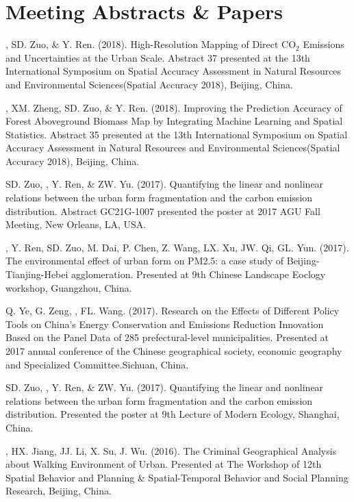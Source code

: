 \section*{Meeting Abstracts \& Papers}
\begin{etaremune}
\item
    \Shaoqing, SD. Zuo, \& Y. Ren. (2018).
    High-Resolution Mapping of Direct CO$_2$ Emissions and Uncertainties at the Urban Scale.
    Abstract 37 presented at the 13th International Symposium on Spatial Accuracy Assessment in Natural Resources and Environmental Sciences(Spatial Accuracy 2018), Beijing, China.
\item
    \Shaoqing\CF, XM. Zheng, SD. Zuo, \& Y. Ren. (2018).
    Improving the Prediction Accuracy of Forest Aboveground Biomass Map by Integrating Machine Learning and Spatial Statistics.
    Abstract 35 presented at the 13th International Symposium on Spatial Accuracy Assessment in Natural Resources and Environmental Sciences(Spatial Accuracy 2018), Beijing, China.
\item
    SD. Zuo, \Shaoqing, Y. Ren, \&  ZW. Yu. (2017).
    Quantifying the linear and nonlinear relations between the urban form fragmentation and the carbon emission distribution.
    Abstract GC21G-1007 presented the poster at 2017 AGU Fall Meeting, New Orleans, LA, USA.
\item
    \Shaoqing, Y. Ren, SD. Zuo, M. Dai, P. Chen, Z. Wang, LX. Xu, JW. Qi, GL. Yun. (2017).
    The environmental effect of urban form on PM2.5: a case study of Beijing-Tianjing-Hebei agglomeration.
    Presented at 9th Chinese Landscape Eoclogy workshop, Guangzhou, China.
\item
    Q. Ye, G. Zeng, \Shaoqing, FL. Wang. (2017).
     Research on the Effects of Different Policy Tools on China’s Energy Conservation and Emissions Reduction Innovation Based on the Panel Data of 285 prefectural-level municipalities.
     Presented at 2017 annual conference of the Chinese geographical society, economic geography and Specialized Committee.Sichuan, China.
\item
    SD. Zuo, \Shaoqing, Y. Ren, \&  ZW. Yu. (2017).
    Quantifying the linear and nonlinear relations between the urban form fragmentation and the carbon emission distribution.
    Presented the poster at 9th Lecture of Modern Ecology, Shanghai, China.
\item
    \Shaoqing, HX. Jiang, JJ. Li, X. Su, J. Wu. (2016).
    The Criminal Geographical Analysis about Walking Environment of Urban.
    Presented at The Workshop of 12th Spatial Behavior and Planning \& Spatial-Temporal Behavior and Social Planning Research, Beijing, China.

\end{etaremune}
